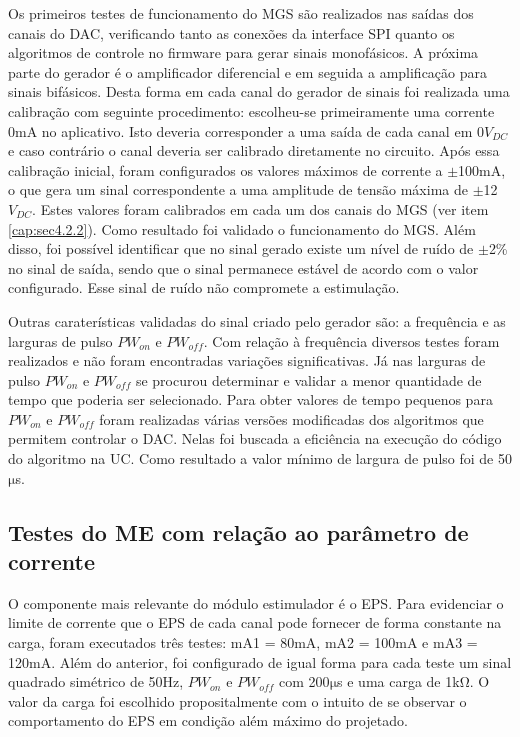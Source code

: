 Os primeiros testes de funcionamento do \acrshort{MGS} são realizados nas saídas dos canais do \acrshort{DAC}, verificando tanto as conexões da interface \acrshort{SPI} quanto os algoritmos de controle no firmware para gerar sinais monofásicos. A próxima parte do gerador é o amplificador diferencial e em seguida a amplificação para sinais bifásicos. Desta forma em cada canal do gerador de sinais foi realizada uma calibração com seguinte procedimento: escolheu-se primeiramente uma corrente 0mA no aplicativo. Isto deveria corresponder a uma saída de cada canal em 0$V_{DC}$ e caso contrário o canal deveria ser calibrado diretamente no circuito. Após essa calibração inicial, foram configurados os valores máximos de corrente a $\mathrm{\pm}$100mA, o que gera um sinal correspondente a uma amplitude de tensão máxima de $\mathrm{\pm}$12$V_{DC}$. Estes valores foram calibrados em cada um dos canais do \acrshort{MGS} (ver item \ref{cap:sec4.2.2}). Como resultado foi validado o funcionamento do \acrshort{MGS}. Além disso, foi possível identificar que no sinal gerado existe um nível de ruído de $\mathrm{\pm}$2\% no sinal de saída, sendo que o sinal permanece estável de acordo com o valor configurado. Esse sinal de ruído não compromete a estimulação.

Outras caraterísticas validadas do sinal criado pelo gerador são: a frequência e as larguras de pulso $PW_{on}$ e $PW_{off}$. Com relação à frequência diversos testes foram realizados e não foram encontradas variações significativas. Já nas larguras de pulso $PW_{on}$ e $PW_{off}$ se procurou determinar e validar a menor quantidade de tempo que poderia ser selecionado. Para obter valores de tempo pequenos para $PW_{on}$ e $PW_{off}$ foram realizadas várias versões modificadas dos algoritmos que permitem controlar o \acrshort{DAC}. Nelas foi buscada a eficiência na execução do código do algoritmo na \acrshort{UC}. Como resultado a valor mínimo de largura de pulso foi de 50$\mathrm{\mu}$s. 


\subsection*{Testes do ME com relação ao parâmetro de corrente}
O componente mais relevante do módulo estimulador é o EPS. Para evidenciar o limite de corrente que o EPS de cada canal pode fornecer de forma constante na carga, foram executados três testes: mA1 = 80mA, mA2 = 100mA e mA3 = 120mA. Além do anterior, foi configurado de igual forma para cada teste um sinal quadrado simétrico de 50Hz, $PW_{on}$ e $PW_{off}$ com 200$\mathrm{\mu}$s e uma carga de 1k$\mathrm{\Omega}$. O valor da carga foi escolhido propositalmente com o intuito de se observar o comportamento do EPS em condição além máximo do projetado. 

